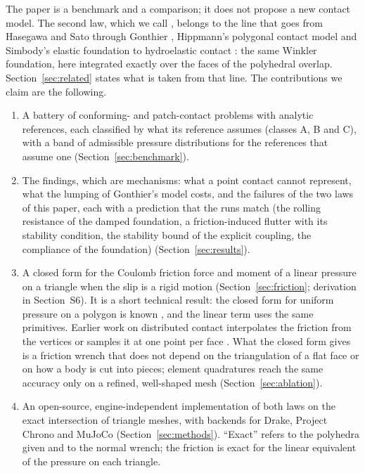 The paper is a benchmark and a comparison; it does not propose a new contact model. The second
law, which we call , belongs to the line that goes from Hasegawa and Sato
\cite{Hasegawa2004} through Gonthier \cite{Gonthier2005}, Hippmann's polygonal contact model
\cite{Hippmann2004} and Simbody's elastic foundation \cite{Sherman2011} to hydroelastic contact
\cite{Elandt2019}: the same Winkler foundation, here integrated exactly over the faces of the
polyhedral overlap. Section~\ref{sec:related} states what is taken from that line. The
contributions we claim are the following.
\begin{enumerate}
\item A battery of conforming- and patch-contact problems with analytic references, each
  classified by what its reference assumes (classes A, B and C), with a band of admissible
  pressure distributions for the references that assume one (Section~\ref{sec:benchmark}).
\item The findings, which are mechanisms: what a point contact cannot represent, what the
  lumping of Gonthier's model costs, and the failures of the two laws of this paper, each with
  a prediction that the runs match (the rolling resistance of the damped foundation, a
  friction-induced flutter with its stability condition, the stability bound of the explicit
  coupling, the compliance of the foundation) (Section~\ref{sec:results}).
\item A closed form for the Coulomb friction force and moment of a linear pressure on a
  triangle when the slip is a rigid motion (Section~\ref{sec:friction};
  derivation in Section~S6). It is a short technical result: the closed form for uniform
  pressure on a polygon is known \cite{Jia1997}, and the linear term uses the same primitives.
  Earlier work on distributed contact interpolates the friction from the vertices or samples it
  at one point per face \cite{Hasegawa2004,ElandtThesis2022}. What the closed form gives is a
  friction wrench that does not depend on the triangulation of a flat face or on how a body is
  cut into pieces; element quadratures reach the same accuracy only on a refined, well-shaped
  mesh (Section~\ref{sec:ablation}).
\item An open-source, engine-independent implementation of both laws on the exact intersection
  of triangle meshes, with backends for Drake, Project Chrono and MuJoCo
  (Section~\ref{sec:methods}). ``Exact'' refers to the polyhedra given and to the normal
  wrench; the friction is exact for the linear equivalent of the pressure on each triangle.
\end{enumerate}

